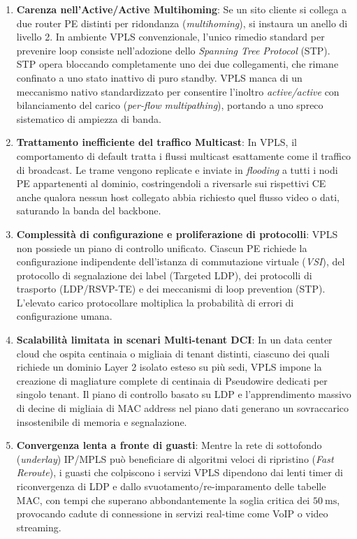 \documentclass[11pt, a4paper]{article}
\begin{document}
\begin{enumerate}
    \item \textbf{Carenza nell'Active/Active Multihoming}:
    Se un sito cliente si collega a due router PE distinti per ridondanza (\emph{multihoming}), si instaura un anello di livello 2. In ambiente VPLS convenzionale, l'unico rimedio standard per prevenire loop consiste nell'adozione dello \emph{Spanning Tree Protocol} (STP). STP opera bloccando completamente uno dei due collegamenti, che rimane confinato a uno stato inattivo di puro standby. VPLS manca di un meccanismo nativo standardizzato per consentire l'inoltro \emph{active/active} con bilanciamento del carico (\emph{per-flow multipathing}), portando a uno spreco sistematico di ampiezza di banda.

    \item \textbf{Trattamento inefficiente del traffico Multicast}:
    In VPLS, il comportamento di default tratta i flussi multicast esattamente come il traffico di broadcast. Le trame vengono replicate e inviate in \emph{flooding} a tutti i nodi PE appartenenti al dominio, costringendoli a riversarle sui rispettivi CE anche qualora nessun host collegato abbia richiesto quel flusso video o dati, saturando la banda del backbone.

    \item \textbf{Complessità di configurazione e proliferazione di protocolli}:
    VPLS non possiede un piano di controllo unificato. Ciascun PE richiede la configurazione indipendente dell'istanza di commutazione virtuale (\emph{VSI}), del protocollo di segnalazione dei label (Targeted LDP), dei protocolli di trasporto (LDP/RSVP-TE) e dei meccanismi di loop prevention (STP). L'elevato carico protocollare moltiplica la probabilità di errori di configurazione umana.

    \item \textbf{Scalabilità limitata in scenari Multi-tenant DCI}:
    In un data center cloud che ospita centinaia o migliaia di tenant distinti, ciascuno dei quali richiede un dominio Layer 2 isolato esteso su più sedi, VPLS impone la creazione di magliature complete di centinaia di Pseudowire dedicati per singolo tenant. Il piano di controllo basato su LDP e l'apprendimento massivo di decine di migliaia di MAC address nel piano dati generano un sovraccarico insostenibile di memoria e segnalazione.

    \item \textbf{Convergenza lenta a fronte di guasti}:
    Mentre la rete di sottofondo (\emph{underlay}) IP/MPLS può beneficiare di algoritmi veloci di ripristino (\emph{Fast Reroute}), i guasti che colpiscono i servizi VPLS dipendono dai lenti timer di riconvergenza di LDP e dallo svuotamento/re-imparamento delle tabelle MAC, con tempi che superano abbondantemente la soglia critica dei $\SI{50}{\milli\second}$, provocando cadute di connessione in servizi real-time come VoIP o video streaming.


\end{enumerate}
\end{document}
